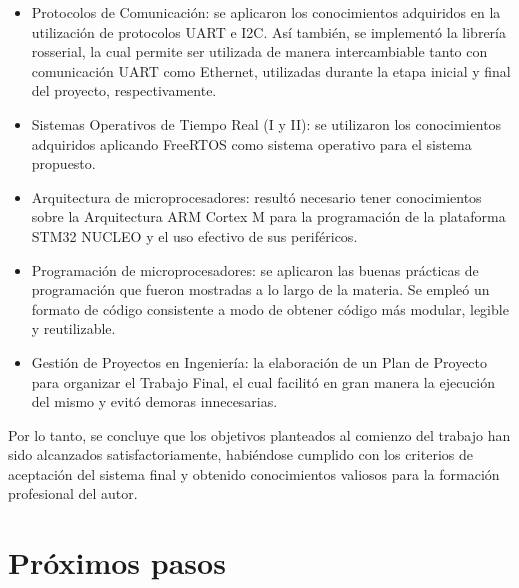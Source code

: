 \begin{itemize}

    \item Protocolos de Comunicación: se aplicaron los conocimientos adquiridos en la utilización de protocolos UART e I2C. Así también, se implementó la librería rosserial, la cual permite ser utilizada de manera intercambiable tanto con comunicación UART como Ethernet, utilizadas durante la etapa inicial y final del proyecto, respectivamente.

    \item Sistemas Operativos de Tiempo Real (I y II): se utilizaron los conocimientos adquiridos aplicando FreeRTOS como sistema operativo para el sistema propuesto.

    \item Arquitectura de microprocesadores: resultó necesario tener conocimientos sobre la Arquitectura ARM Cortex M para la programación de la plataforma STM32 NUCLEO y el uso efectivo de sus periféricos.

    \item Programación de microprocesadores: se aplicaron las buenas prácticas de programación que fueron mostradas a lo largo de la materia. Se empleó un formato de código consistente a modo de obtener código más modular, legible y reutilizable.

    \item Gestión de Proyectos en Ingeniería: la elaboración de un Plan de Proyecto para organizar el Trabajo Final, el cual facilitó en gran manera la ejecución del mismo y evitó demoras innecesarias.

\end{itemize}

Por lo tanto, se concluye que los objetivos planteados al comienzo del trabajo han sido alcanzados satisfactoriamente, habiéndose cumplido con los criterios de aceptación del sistema final y obtenido conocimientos valiosos para la formación profesional del autor.

\section{Próximos pasos}

